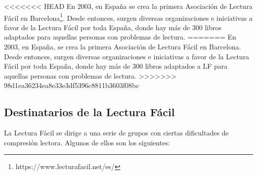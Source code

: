  \setlength{\parskip}{10pt}
 
<<<<<<< HEAD
En 2003, en España se crea la primera Asociación de Lectura Fácil en Barcelona\footnote{https://www.lecturafacil.net/es/}. Desde entonces, surgen diversas organizaciones e iniciativas a favor de la Lectura Fácil por toda España, donde hay más de 300 libros adaptados para aquellas personas con problemas de lectura.
=======
En 2003, en España, se crea la primera Asociación de Lectura Fácil en Barcelona. Desde entonces, surgen diversas organizaciones e iniciativas a favor de la Lectura Fácil por toda España, donde hay más de 300 libros adaptados a LF para aquellas personas con problemas de lectura.
>>>>>>> 98d1ea36234ea8e33e3df5396c8811b3603f08bc

\subsection{Destinatarios de la Lectura Fácil}
La Lectura Fácil se dirige a una serie de grupos con ciertas dificultades de compresión lectora. Algunos de ellos son los siguientes: 
 
